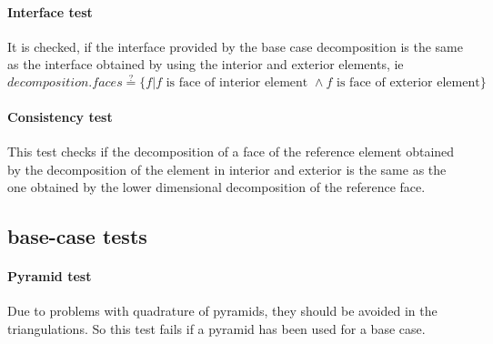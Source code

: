 \documentclass[a4paper, 11pt]{scrartcl}
\begin{document}
\paragraph*{Interface test}
It is checked, if the interface provided by the base case decomposition is the same as the interface obtained by using the interior and exterior elements, ie \\
$decomposition.faces \stackrel{?}{=} \lbrace f | f\text{ is face of interior element }\wedge f\text{ is face of exterior element}\rbrace$
\paragraph*{Consistency test}
This test checks if the decomposition of a face of the reference element obtained by the decomposition of the element in interior and exterior is the same as the one obtained by the lower dimensional decomposition of the reference face.
\subsection*{base-case tests}
\paragraph*{Pyramid test}
Due to problems with quadrature of pyramids, they should be avoided in
the triangulations. So this test fails if a pyramid has been used for
a base case.
\end{document}
